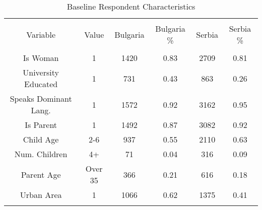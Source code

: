 
\begin{table}[!htbp] \centering 
  \caption{Baseline Respondent Characteristics} 
  \label{tbl:Baseline Respondent Characteristics} 
\begin{tabular}{@{\extracolsep{5pt}} cccccc} 
\\[-1.8ex]\hline 
\hline \\[-1.8ex] 
Variable & Value & Bulgaria & Bulgaria \% & Serbia & Serbia \% \\ 
\hline \\[-1.8ex] 
Is Woman & 1 & 1420 & 0.83 & 2709 & 0.81 \\ 
University Educated & 1 &  731 & 0.43 &  863 & 0.26 \\ 
Speaks Dominant Lang. & 1 & 1572 & 0.92 & 3162 & 0.95 \\ 
Is Parent & 1 & 1492 & 0.87 & 3082 & 0.92 \\ 
Child Age & 2-6 &  937 & 0.55 & 2110 & 0.63 \\ 
Num. Children & 4+ &   71 & 0.04 &  316 & 0.09 \\ 
Parent Age & Over 35 &  366 & 0.21 &  616 & 0.18 \\ 
Urban Area & 1 & 1066 & 0.62 & 1375 & 0.41 \\ 
\hline \\[-1.8ex] 
\end{tabular} 
\end{table} 
